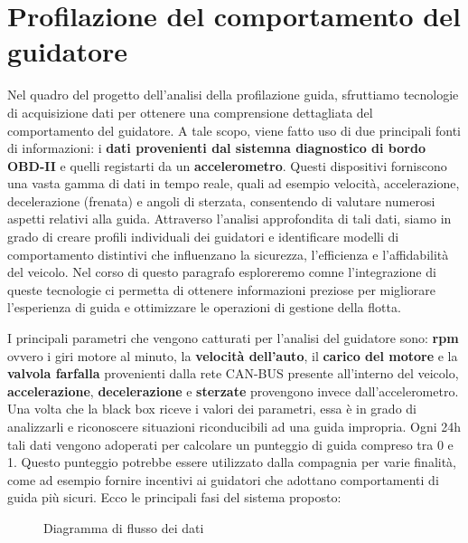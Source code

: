 \documentclass[12pt, a4paper, italian]{report}
\numberwithin{figure}{chapter}
\numberwithin{table}{chapter}
\begin{document}
\section{Profilazione del comportamento del guidatore}
Nel quadro del progetto dell'analisi della profilazione guida, sfruttiamo tecnologie di acquisizione dati per ottenere una comprensione dettagliata del comportamento del guidatore. A tale scopo, viene fatto uso di due principali fonti di informazioni: i \textbf{dati provenienti dal sistemna diagnostico di bordo OBD-II} e quelli registarti da un \textbf{accelerometro}. Questi dispositivi forniscono una vasta gamma di dati in tempo reale, quali ad esempio velocità, accelerazione, decelerazione (frenata) e angoli di sterzata, consentendo di valutare numerosi aspetti relativi alla guida. Attraverso l'analisi approfondita di tali dati, siamo in grado di creare profili individuali dei guidatori e identificare modelli di comportamento distintivi che influenzano la sicurezza, l'efficienza e l'affidabilità del veicolo. Nel corso di questo paragrafo esploreremo comne l'integrazione di queste tecnologie ci permetta di ottenere informazioni preziose per migliorare l'esperienza di guida e ottimizzare le operazioni di gestione della flotta.
\vspace{1cm} %

I principali parametri che vengono catturati per l'analisi del guidatore sono: \textbf{rpm} ovvero i giri motore al minuto, la \textbf{velocità dell'auto}, il \textbf{carico del motore} e la \textbf{valvola farfalla} provenienti dalla rete CAN-BUS presente all'interno del veicolo, \textbf{accelerazione}, \textbf{decelerazione} e \textbf{sterzate} provengono invece dall'accelerometro. Una volta che la black box riceve i valori dei parametri, essa è in grado di analizzarli e riconoscere situazioni riconducibili ad una guida impropria. Ogni 24h tali dati vengono adoperati per calcolare un punteggio di guida compreso tra 0 e 1. Questo punteggio potrebbe essere utilizzato dalla compagnia per varie finalità, come ad esempio fornire incentivi ai guidatori che adottano comportamenti di guida più sicuri. Ecco le principali fasi del sistema proposto:

\vspace{1.2cm}

\begin{figure}[h!]
\centering
{}
\caption{Diagramma di flusso dei dati}
\label{diagramma-flusso}
\end{figure}
\end{document}
